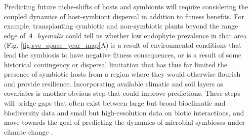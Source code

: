 \documentclass[11pt]{article}
\let\cite\citep
\begin{document}
Predicting future niche-shifts of hosts and symbionts will require considering the coupled dynamics of host-symbiont dispersal in addition to fitness benefits.
For example, transplanting symbiotic and non-symbiotic plants beyond the range edge of \emph{A. hyemalis} could tell us whether low endophyte prevalence in that area (Fig. \ref{fig:svc_space_year_map}A) is a result of environmental conditions that lead the symbiosis to have negative fitness consequences, or is a result of some historical contingency or dispersal limitation that has thus far limited the presence of symbiotic hosts from a region where they would otherwise flourish and provide resilience.
Incorporating available climatic and soil layers as covariates is another obvious step that could improve predictions.
These steps will bridge gaps that often exist between large but broad bioclimatic and biodiversity data and small but high-resolution data on biotic interactions, and move towards the goal of predicting the dynamics of microbial symbioses under climate change \cite{miller2019recent, isaac2020data}.
\end{document}
